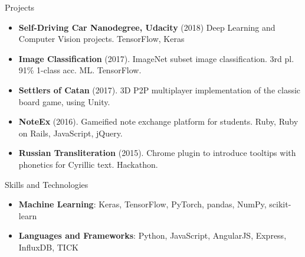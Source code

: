 \documentclass[]{muchicv}
\begin{document}
	\begin{cvsection}{Projects}
		\begin{cvsubsection}{}{}{}
			\begin{itemize}
				\item \textbf{Self-Driving Car Nanodegree, Udacity} (2018) Deep Learning and Computer Vision projects. TensorFlow, Keras
				\item \textbf{Image Classification} (2017). ImageNet subset image classification. 3rd pl. 91\% 1-class acc. ML. TensorFlow.
				\item \textbf{Settlers of Catan} (2017).  3D P2P multiplayer implementation of the classic board game, using Unity.
				\item \textbf{NoteEx} (2016). Gameified note exchange platform for students. Ruby, Ruby on Rails, JavaScript, jQuery.
				\item \textbf{Russian Transliteration} (2015). Chrome plugin to introduce tooltips with phonetics for Cyrillic text. Hackathon.
			\end{itemize}
		\end{cvsubsection}
	\end{cvsection}
	
	\begin{cvsection}{Skills and Technologies}
		\begin{cvsubsection}{}{}{}	
			\begin{itemize}
				\item \textbf{Machine Learning}: Keras, TensorFlow, PyTorch, pandas, NumPy, scikit-learn
				\item \textbf{Languages and Frameworks}: Python, JavaScript, AngularJS, Express, InfluxDB, TICK
			\end{itemize}
		\end{cvsubsection}
	\end{cvsection}
	
\end{document}
